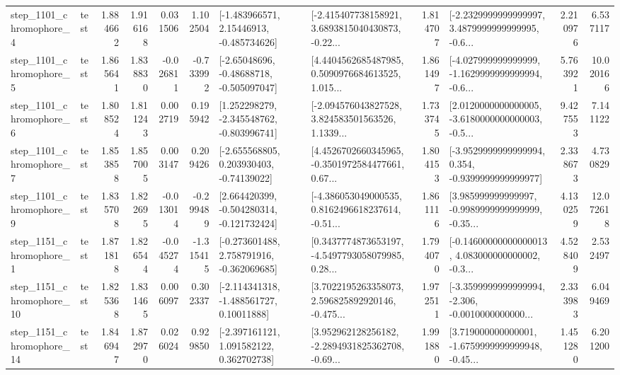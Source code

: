 \begin{tabular}{llrrrrllrlrr}
  step\_1101\_chromophore\_4 &      test &      1.884662 &    1.916168 &      0.031506 &  1.102504 &    [-1.483966571, 2.15446913, -0.485734626] &  [-2.415407738158921, 3.6893815040430873, -0.22... &       1.814707 &  [-2.2329999999999997, 3.4879999999999995, -0.6... &            2.210976 &          6.537117 \\
  step\_1101\_chromophore\_5 &      test &      1.865641 &    1.838830 &     -0.026811 & -0.733992 &    [-2.65048696, -0.48688718, -0.505097047] &  [4.4404562685487985, 0.5090976684613525, 1.015... &       1.861497 &  [-4.027999999999999, -1.1629999999999994, -0.6... &            5.763921 &         10.020166 \\
  step\_1101\_chromophore\_6 &      test &      1.808524 &    1.811243 &      0.002719 &  0.195942 &   [1.252298279, -2.345548762, -0.803996741] &  [-2.094576043827528, 3.824583501563526, 1.1339... &       1.733745 &  [2.0120000000000005, -3.6180000000000003, -0.5... &            9.427553 &          7.141122 \\
  step\_1101\_chromophore\_7 &      test &      1.853858 &    1.857005 &      0.003147 &  0.209426 &    [-2.655568805, 0.203930403, -0.74139022] &  [4.4526702660345965, -0.3501972584477661, 0.67... &       1.804153 &  [-3.9529999999999994, 0.354, -0.9399999999999977] &            2.338673 &          4.730829 \\
  step\_1101\_chromophore\_9 &      test &      1.835708 &    1.822695 &     -0.013014 & -0.299489 &   [2.664420399, -0.504280314, -0.121732424] &  [-4.386053049000535, 0.8162496618237614, -0.51... &       1.861116 &  [3.985999999999997, -0.9989999999999999, -0.35... &            4.130259 &         12.072618 \\
  step\_1151\_chromophore\_1 &      test &      1.871818 &    1.826544 &     -0.045274 & -1.315415 &   [-0.273601488, 2.758791916, -0.362069685] &  [0.3437774873653197, -4.5497793058079985, 0.28... &       1.794070 &  [-0.14600000000000013, 4.083000000000002, -0.3... &            4.528409 &          2.532497 \\
 step\_1151\_chromophore\_10 &      test &      1.825368 &    1.831465 &      0.006097 &  0.302337 &    [-2.114341318, -1.488561727, 0.10011888] &  [3.7022195263358073, 2.596825892920146, -0.475... &       1.972511 &  [-3.3599999999999994, -2.306, -0.0010000000000... &            2.333983 &          6.049469 \\
 step\_1151\_chromophore\_14 &      test &      1.846947 &    1.872970 &      0.026024 &  0.929850 &    [-2.397161121, 1.091582122, 0.362702738] &  [3.952962128256182, -2.2894931825362708, -0.69... &       1.991880 &  [3.719000000000001, -1.6759999999999948, -0.45... &            1.451280 &          6.201200 \\

\end{tabular}
